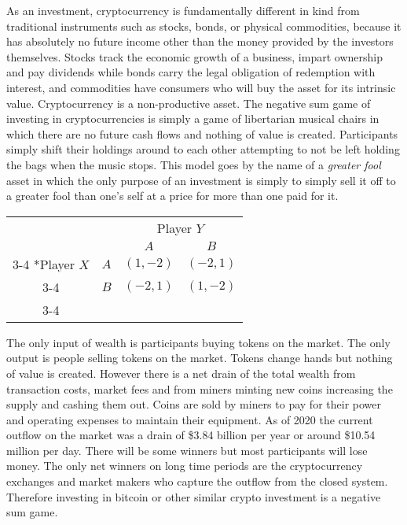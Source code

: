 As an investment, cryptocurrency is fundamentally different in kind from
traditional instruments such as stocks, bonds, or physical commodities, because
it has absolutely no future income other than the money provided by the
investors themselves. Stocks track the economic growth of a business, impart
ownership and pay dividends while bonds carry the legal obligation of redemption
with interest, and commodities have consumers who will buy the asset for its
intrinsic value. Cryptocurrency is a non-productive asset. The negative sum game
of investing in cryptocurrencies is simply a game of libertarian musical chairs
in which there are no future cash flows and nothing of value is created.
Participants simply shift their holdings around to each other attempting to not
be left holding the bags when the music stops. This model goes by the name of a
\textit{greater fool} asset in which the only purpose of an investment is
simply to simply sell it off to a greater fool than one's self at a price for
more than one paid for it. \cite{bank2018v}

\begin{table}
  \setlength{\extrarowheight}{2pt}
  \begin{tabular}{cc|c|c|}
    & \multicolumn{1}{c}{} & \multicolumn{2}{c}{Player $Y$}\\
    & \multicolumn{1}{c}{} & \multicolumn{1}{c}{$A$}  & \multicolumn{1}{c}{$B$} \\\cline{3-4}
    \multirow{2}*{Player $X$}
    & $A$ & $(1,-2)$ & $(-2,1)$ \\\cline{3-4}
    & $B$ & $(-2,1)$ & $(1,-2)$    \\\cline{3-4}
  \end{tabular}
\end{table}


The only input of wealth is participants buying tokens on the market. The only
output is people selling tokens on the market. Tokens change hands but nothing
of value is created. However there is a net drain of the total wealth from
transaction costs, market fees and from miners minting new coins increasing the
supply and cashing them out. \cite{pyramid, catalini2016some} Coins are sold by
miners to pay for their power and operating expenses to maintain their
equipment.  As of 2020 the current outflow on the market was a drain of \$3.84
billion per year or around \$10.54 million per day. There will be some winners
but most participants will lose money. The only net winners on long time periods
are the cryptocurrency exchanges and market makers who capture the outflow from
the closed system. Therefore investing in bitcoin or other similar crypto
investment is a negative sum game.

